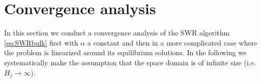 % 

\section{Convergence analysis} \label{sec:conv-lin}
In this section we conduct a convergence analysis of the SWR algorithm 
\eqref{eq:SWRbulk} first with $\alpha$ a constant and then in a more 
complicated case where the problem is linearized around its 
equilibrium solutions. In the following we systematically make the assumption 
that the space domain is of infinite size (i.e. $H_j\to\infty$).
